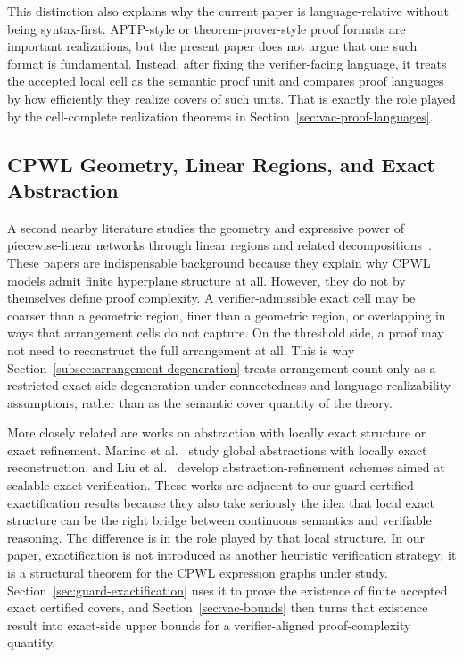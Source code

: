 This distinction also explains why the current paper is language-relative without being syntax-first. APTP-style or theorem-prover-style proof formats are important realizations, but the present paper does not argue that one such format is fundamental. Instead, after fixing the verifier-facing language, it treats the accepted local cell as the semantic proof unit and compares proof languages by how efficiently they realize covers of such units. That is exactly the role played by the cell-complete realization theorems in Section~\ref{sec:vac-proof-languages}.

\subsection{CPWL Geometry, Linear Regions, and Exact Abstraction}

A second nearby literature studies the geometry and expressive power of piecewise-linear networks through linear regions and related decompositions~\cite{Montufar2014LinearRegions,Raghu2017ExpressivePower,Serra2018Counting}. These papers are indispensable background because they explain why CPWL models admit finite hyperplane structure at all. However, they do not by themselves define proof complexity. A verifier-admissible exact cell may be coarser than a geometric region, finer than a geometric region, or overlapping in ways that arrangement cells do not capture. On the threshold side, a proof may not need to reconstruct the full arrangement at all. This is why Section~\ref{subsec:arrangement-degeneration} treats arrangement count only as a restricted exact-side degeneration under connectedness and language-realizability assumptions, rather than as the semantic cover quantity of the theory.

More closely related are works on abstraction with locally exact structure or exact refinement. Manino et al.~\cite{Manino2023GlobalAbstractions} study global abstractions with locally exact reconstruction, and Liu et al.~\cite{Liu2024AbstractionRefinement} develop abstraction-refinement schemes aimed at scalable exact verification. These works are adjacent to our guard-certified exactification results because they also take seriously the idea that local exact structure can be the right bridge between continuous semantics and verifiable reasoning. The difference is in the role played by that local structure. In our paper, exactification is not introduced as another heuristic verification strategy; it is a structural theorem for the CPWL expression graphs under study. Section~\ref{sec:guard-exactification} uses it to prove the existence of finite accepted exact certified covers, and Section~\ref{sec:vac-bounds} then turns that existence result into exact-side upper bounds for a verifier-aligned proof-complexity quantity.


